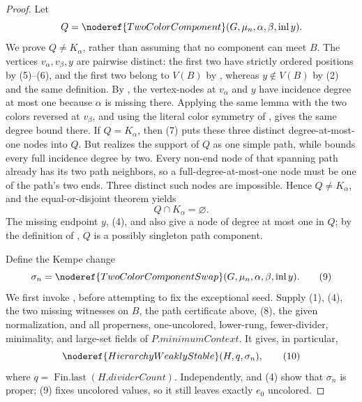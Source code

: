 \begin{proof}
Let
\[
 Q=\noderef{TwoColorComponent}
      (G,\mu_n,\alpha,\beta,\operatorname{inl}y).
\]
We prove \(Q\ne K_\alpha\), rather than assuming that no component can
meet \(B\).  The vertices \(v_\alpha,v_\beta,y\) are pairwise distinct:
the first two have strictly ordered positions by (5)--(6), and the first
two belong to \(V(B)\) by , whereas
\(y\notin V(B)\) by (2) and the same definition.
By , the vertex-nodes at
\(v_\alpha\) and \(y\) have incidence degree at most one because
\(\alpha\) is missing there.  Applying the same lemma with the two colors
reversed at \(v_\beta\), and using the literal color symmetry of
, gives the same degree bound there.
If \(Q=K_\alpha\), then (7) puts these three distinct degree-at-most-one
nodes into \(Q\).  But  realizes
the support of \(Q\) as one simple path, while
 bounds every full incidence
degree by two.  Every non-end node of that spanning path already has its
two path neighbors, so a full-degree-at-most-one node must be one of the
path's two ends.  Three distinct such nodes are impossible.  Hence
\(Q\ne K_\alpha\), and the equal-or-disjoint theorem
 yields
\[
                             Q\cap K_\alpha=\varnothing.       \tag{8}
\]
The missing endpoint \(y\), (4), and
 also give a node of degree at most
one in \(Q\); by the definition of
, \(Q\) is a possibly singleton path
component.

Define the Kempe change
\[
 \sigma_n=\noderef{TwoColorComponentSwap}
   (G,\mu_n,\alpha,\beta,\operatorname{inl}y).                \tag{9}
\]
We first invoke , before attempting to
fix the exceptional seed.  Supply (1), (4), the two missing witnesses on
\(B\), the path certificate above, (8), the given normalization, and all
properness, one-uncolored, lower-rung, fewer-divider, minimality, and
large-set fields of \(P.\mathit{minimumContext}\).  It gives, in
particular,
\[
       \noderef{HierarchyWeaklyStable}(H,q,\sigma_n),          \tag{10}
\]
where \(q=\operatorname{Fin.last}(H.\mathit{dividerCount})\).
Independently,  and (4) show that
\(\sigma_n\) is proper; (9) fixes uncolored values, so it still leaves
exactly \(e_0\) uncolored.


\end{proof}
